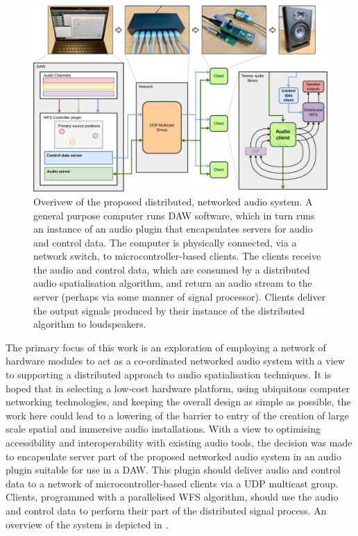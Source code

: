 \begin{figure}[ht]
    \centering
    \includegraphics[width=\textwidth]{figures/system_overview}
    \caption{
        Overivew of the proposed distributed, networked audio system.
        A general purpose computer runs DAW software, which in turn runs an
        instance of an audio plugin that encapsulates servers for audio and
        control data.
        The computer is physically connected, via a network switch, to
        microcontroller-based clients.
        The clients receive the audio and control data, which are consumed by
        a distributed audio spatialisation algorithm, and return an audio stream
        to the server (perhaps via some manner of signal processor).
        Clients deliver the output signals produced by their instance of the
        distributed algorithm to loudspeakers.
    }
    \label{fig:system-overview}
\end{figure}

The primary focus of this work is an exploration of employing a network of
hardware modules to act as a co-ordinated networked audio system with a view to
supporting a distributed approach to audio spatialisation techniques.
It is hoped that in selecting a low-cost hardware platform, using ubiquitous
computer networking technologies, and keeping the overall design as simple as
possible, the work here could lead to a lowering of the barrier to entry of
the creation of large scale spatial and immersive audio installations.
With a view to optimising accessibility and interoperability with existing audio
tools, the decision was made to encapsulate server part of the proposed
networked audio system in an audio plugin suitable for use in a DAW.
This plugin should deliver audio and control data to a network of
microcontroller-based clients via a UDP multicast group.
Clients, programmed with a parallelised WFS algorithm, should use the audio and
control data to perform their part of the distributed signal process.
An overview of the system is depicted in .

